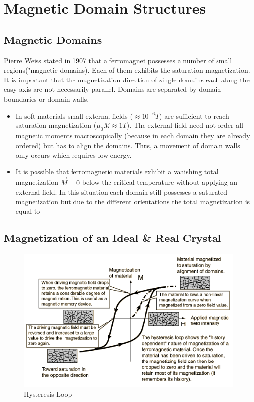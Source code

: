 \documentclass[10pt]{article} %
\begin{document}
\section{Magnetic Domain Structures} %
\subsection{Magnetic Domains}
Pierre Weiss stated in 1907 that a ferromagnet possesses a number of small regions("magnetic domains). Each of them exhibits the saturation magnetization. It is important that the magnetization direction of single domains each along the easy axis are not necessarily parallel. Domains are separated by domain boundaries or domain walls.

\begin{itemize}
\item In soft materials small external fields ($\approx 10^{-6} T$) are sufficient to reach saturation magnetization ($\mu_0 M \approx 1T$). The external field need not order all magnetic moments macroscopically (because in each domain they are already ordered) but has to align the domains. Thus, a movement of domain walls only occurs which requires low energy.

\item It is possible that ferromagnetic materials exhibit a vanishing total magnetization $\vec{M} = 0$ below the critical temperature without applying an external field. In this situation each domain still possesses a  saturated magnetization but due to the different orientations the total magnetization is equal to 
\end{itemize}

\subsection{Magnetization of an Ideal & Real Crystal}




\begin{figure}[H]
\begin{center}
\includegraphics[scale=1.0]{hyloop}
\caption{Hysteresis Loop}
\end{center}
\end{figure}
\end{document}

